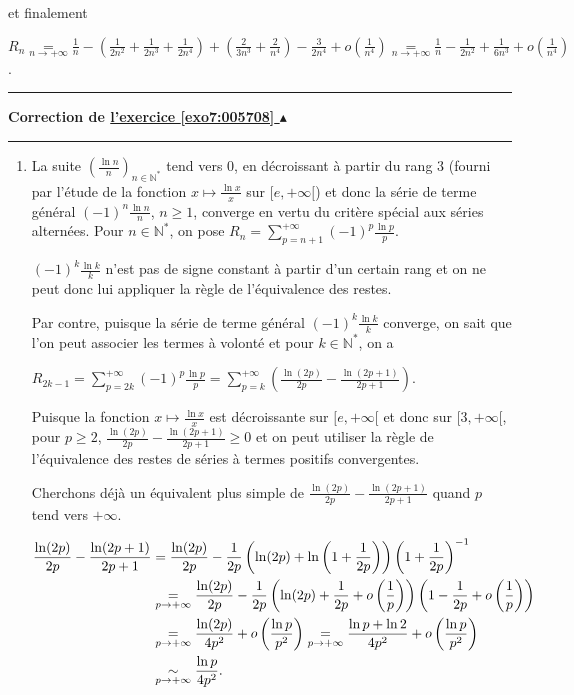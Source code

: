 \documentclass[11pt,a4paper]{article}
\newcommand{\Nn}{\mathbb{N}} \newcommand{\N}{\mathbb{N}}
\newcounter{exo}
\newcommand{\correction}[1]{\hypertarget{cor7:#1}{}\label{cor7:#1}{\bf Correction de \hyperlink{exo7:#1}{l'exercice \ref{exo7:#1} $\blacktriangle$}}\vspace{1mm}\hrule\vspace{1mm}}
\newcommand{\fincorrection}{\vspace{1mm}\hrule\vspace*{7mm}}
\begin{document}
et finalement

\begin{center}
$R_n\underset{n\rightarrow+\infty}{=}\frac{1}{n}-\left(\frac{1}{2n^2}+\frac{1}{2n^3}+\frac{1}{2n^4}\right)+\left(\frac{2}{3n^3}+\frac{2}{n^4}\right)-\frac{3}{2n^4}+o\left(\frac{1}{n^4}\right)\underset{n\rightarrow+\infty}{=}\frac{1}{n}-\frac{1}{2n^2}+\frac{1}{6n^3}+o\left(\frac{1}{n^4}\right)$.
\end{center}

\begin{center}
\end{center}
\fincorrection
\correction{005708}
\begin{enumerate}
 \item  La suite $\left(\frac{\ln n}{n}\right)_{n\in\Nn^*}$ tend vers $0$, en décroissant à partir du rang $3$ (fourni par l'étude de la fonction $x\mapsto\frac{\ln x}{x}$ sur $[e,+\infty[$) et donc la série de terme général $(-1)^n\frac{\ln n}{n}$, $n\geqslant1$, converge en vertu du critère spécial aux séries alternées. Pour $n\in\Nn^*$, on pose $R_n=\sum_{p=n+1}^{+\infty}(-1)^p\frac{\ln p}{p}$.

$(-1)^k\frac{\ln k}{k}$  n'est pas de signe constant à partir d'un certain rang et on ne peut donc lui appliquer la règle de l'équivalence des restes.

Par contre, puisque la série de terme général $(-1)^k\frac{\ln k}{k}$ converge, on sait que l'on peut associer les termes à volonté et pour $k\in\Nn^*$, on a

\begin{center}
$R_{2k-1}=\sum_{p=2k}^{+\infty}(-1)^p\frac{\ln p}{p}=\sum_{p=k}^{+\infty}\left(\frac{\ln(2p)}{2p}-\frac{\ln(2p+1)}{2p+1}\right)$.
\end{center}

Puisque la fonction  $x\mapsto\frac{\ln x}{x}$ est décroissante sur $[e,+\infty[$ et donc sur $[3,+\infty[$, pour $p\geqslant 2$, $\frac{\ln(2p)}{2p}-\frac{\ln(2p+1)}{2p+1}\geqslant0$ et on peut utiliser la règle de l'équivalence des restes de séries à termes positifs convergentes.

Cherchons déjà un équivalent plus simple de $\frac{\ln(2p)}{2p}-\frac{\ln(2p+1)}{2p+1}$ quand $p$ tend vers $+\infty$.

\begin{align*}\ensuremath
\frac{\ln(2p)}{2p}-\frac{\ln(2p+1)}{2p+1}&=\frac{\ln(2p)}{2p}-\frac{1}{2p}\left(\ln(2p)+\ln\left(1+\frac{1}{2p}\right)\right)\left(1+\frac{1}{2p}\right)^{-1}\\
 &\underset{p\rightarrow+\infty}{=}\frac{\ln(2p)}{2p}-\frac{1}{2p}\left(\ln(2p)+\frac{1}{2p}+o\left(\frac{1}{p}\right)\right)\left(1-\frac{1}{2p}+o\left(\frac{1}{p}\right)\right)\\
 &\underset{p\rightarrow+\infty}{=}\frac{\ln(2p)}{4p^2}+o\left(\frac{\ln p}{p^2}\right)\underset{p\rightarrow+\infty}{=}\frac{\ln p+\ln2}{4p^2}+o\left(\frac{\ln p}{p^2}\right)\\
 &\underset{p\rightarrow+\infty}{\sim}\frac{\ln p}{4p^2}.
\end{align*}   


\end{enumerate}
\end{document}
